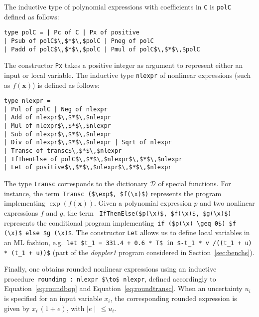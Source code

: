 \documentclass[preprint]{sigplanconf}
\newcommand{\code}[1]{\lstinline{#1}}
\newcommand{\setD}{\mathcal{D}} %
\newcommand{\x}{\mathbf{x}}
\theoremstyle{plain}
\begin{document}
The inductive type of polynomial expressions with coefficients in \code{C} is \code{polC} defined as follows:
\begin{lstlisting}
type polC = | Pc of C | Px of positive 
| Psub of polC$\,$*$\,$polC | Pneg of polC 
| Padd of polC$\,$*$\,$polC | Pmul of polC$\,$*$\,$polC
\end{lstlisting}
%
The constructor \code{Px} takes a positive integer as argument to represent either an input or local variable.
The inductive type \code{nlexpr} of nonlinear expressions (such as $f(\x)$) is defined as follows:
\begin{lstlisting}
type nlexpr = 
| Pol of polC | Neg of nlexpr
| Add of nlexpr$\,$*$\,$nlexpr 
| Mul of nlexpr$\,$*$\,$nlexpr 
| Sub of nlexpr$\,$*$\,$nlexpr 
| Div of nlexpr$\,$*$\,$nlexpr | Sqrt of nlexpr 
| Transc of transc$\,$*$\,$nlexpr
| IfThenElse of polC$\,$*$\,$nlexpr$\,$*$\,$nlexpr
| Let of positive$\,$*$\,$nlexpr$\,$*$\,$nlexpr
\end{lstlisting}
%
The type \code{transc} corresponds to the dictionary $\setD$ of special functions. For instance, the term~\lstinline|Transc ($\exp$, $f(\x)$)| represents the program implementing $\exp(f(\x))$.
Given a polynomial expression $p$ and two nonlinear expressions $f$ and $g$, the term ~\lstinline|IfThenElse($p(\x)$, $f(\x)$, $g(\x)$)| represents the conditional program implementing~\lstinline|if ($p(\x) \geq 0$) $f (\x)$ else $g (\x)$|. The constructor \code{Let} allows us to define local variables in an ML fashion, e.g.~\lstinline|let $t_1 = 331.4 + 0.6 * T$ in $-t_1 * v /((t_1 + u) * (t_1 + u))$| (part of the \textit{doppler1} program considered in Section~\ref{sec:benchs}).
%
%

Finally, one obtains rounded nonlinear expressions using an inductive procedure~\lstinline|rounding : nlexpr $\to$ nlexpr|, defined accordingly to Equation~\eqref{eq:roundbop} and Equation~\eqref{eq:roundtransc}. When an uncertainty $u_i$ is specified for an input variable $x_i$, the corresponding rounded expression is given by $x_i \, (1 + e)$, with $\mid e \mid \, \leq u_i$.

\end{document}
